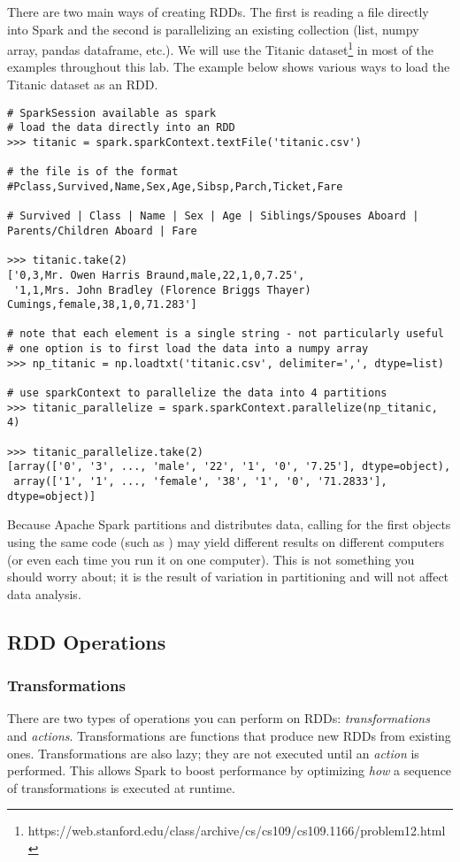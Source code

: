 There are two main ways of creating RDDs. 
The first is reading a file directly into Spark and the second is parallelizing an existing collection (list, numpy array, pandas dataframe, etc.). 
We will use the Titanic dataset\footnote{https://web.stanford.edu/class/archive/cs/cs109/cs109.1166/problem12.html} in most of the examples throughout this lab.  
The example below shows various ways to load the Titanic dataset as an RDD.

\begin{lstlisting}
# SparkSession available as spark
# load the data directly into an RDD
>>> titanic = spark.sparkContext.textFile('titanic.csv')

# the file is of the format
#Pclass,Survived,Name,Sex,Age,Sibsp,Parch,Ticket,Fare

# Survived | Class | Name | Sex | Age | Siblings/Spouses Aboard | Parents/Children Aboard | Fare

>>> titanic.take(2)
['0,3,Mr. Owen Harris Braund,male,22,1,0,7.25',
 '1,1,Mrs. John Bradley (Florence Briggs Thayer) Cumings,female,38,1,0,71.283']

# note that each element is a single string - not particularly useful
# one option is to first load the data into a numpy array
>>> np_titanic = np.loadtxt('titanic.csv', delimiter=',', dtype=list)

# use sparkContext to parallelize the data into 4 partitions
>>> titanic_parallelize = spark.sparkContext.parallelize(np_titanic, 4)

>>> titanic_parallelize.take(2)
[array(['0', '3', ..., 'male', '22', '1', '0', '7.25'], dtype=object),
 array(['1', '1', ..., 'female', '38', '1', '0', '71.2833'], dtype=object)]
\end{lstlisting}

\begin{warn}
Because Apache Spark partitions and distributes data, calling for the first  objects using the same code (such as ) may yield different results on different computers (or even each time you run it on one computer). 
This is not something you should worry about; it is the result of variation in partitioning and will not affect data analysis.
\end{warn}

\subsection*{RDD Operations}
\subsubsection*{Transformations}
There are two types of operations you can perform on RDDs: \textit{transformations} and \textit{actions}.
Transformations are functions that produce new RDDs from existing ones.
Transformations are also lazy; they are not executed until an \textit{action} is performed.
This allows Spark to boost performance by optimizing \textit{how} a sequence of transformations is executed at runtime.

